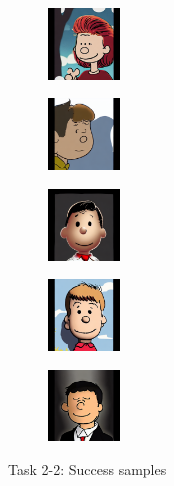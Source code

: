 \documentclass{article}
\begin{document}
\begin{enumerate}
\begin{enumerate}
\begin{figure}[h!]
\begin{minipage}{0.8\textwidth}
						\begin{subfigure}[b]{0.18\textwidth}
							\centering
							\includegraphics[height=1.9cm]{000002_styled}
						\end{subfigure}
						\hfill
						\begin{subfigure}[b]{0.18\textwidth}
							\centering
							\includegraphics[height=1.9cm]{000003_styled}
						\end{subfigure}
						\hfill
						\begin{subfigure}[b]{0.18\textwidth}
							\centering
							\includegraphics[height=1.9cm]{000012_styled}
						\end{subfigure}
						\hfill
						\begin{subfigure}[b]{0.18\textwidth}
							\centering
							\includegraphics[height=1.9cm]{000005_styled}
						\end{subfigure}
						\hfill
						\begin{subfigure}[b]{0.18\textwidth}
							\centering
							\includegraphics[height=1.9cm]{000055_styled}
						\end{subfigure}

						\caption{Task 2-2: Success samples}
						\vspace{0.6cm} %


\end{minipage}
\end{figure}
\end{enumerate}
\end{enumerate}
\end{document}
